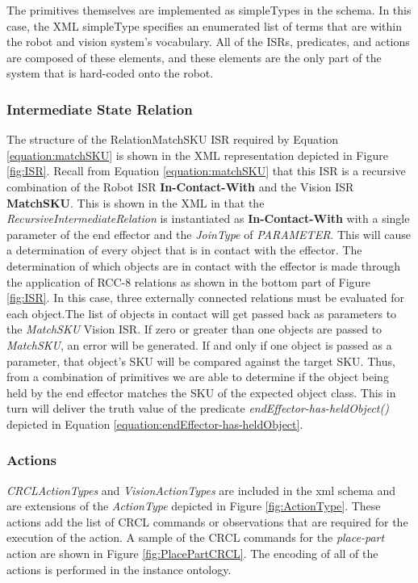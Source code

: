 The primitives themselves are implemented as simpleTypes in the schema.
In this case, the XML simpleType specifies an enumerated list of terms
that are within the robot and vision system's vocabulary. All of the
ISRs, predicates, and actions are composed of these elements, and these
elements are the only part of the system that is hard-coded onto the
robot.
\subsubsection{Intermediate State Relation}
The structure of the RelationMatchSKU ISR required by Equation \ref{equation:matchSKU} is shown in the XML
representation
depicted in Figure \ref{fig:ISR}. 
Recall from Equation \ref{equation:matchSKU} that this ISR is 
a recursive combination of the Robot ISR \textbf{In-Contact-With} and
the Vision ISR \textbf{MatchSKU}. This is shown in the XML in that
the \textit{RecursiveIntermediateRelation} is instantiated as
\textbf{In-Contact-With} with a single parameter of the end effector
and the \textit{JoinType} of \textit{PARAMETER}. This will cause a determination
of every object that is in contact with the effector. The 
determination of which objects are in contact with the effector
is made through the application of RCC-8 relations as shown in
the bottom part of Figure \ref{fig:ISR}. In this case, three
externally connected relations must be evaluated for each
object.The list of objects in contact
will get passed back as parameters to the \textit{MatchSKU} Vision ISR.
If zero or greater than one objects are passed to \textit{MatchSKU},
an error will be generated. If and only if one object is passed as
a parameter, that object's SKU will be compared against the target
SKU. Thus, from a combination of primitives we are able to determine
if the object being held by the end effector matches the SKU of the
expected object class. This in turn will deliver the truth value
of the predicate \textit{endEffector-has-heldObject()} depicted
in Equation \ref{equation:endEffector-has-heldObject}.  
\subsubsection{Actions}
\textit{CRCLActionTypes} and \textit{VisionActionTypes} are included
in the xml schema and are extensions of the \textit{ActionType} depicted
in Figure \ref{fig:ActionType}. These actions add the list of CRCL commands or observations that are required for the execution of the action. A sample of the CRCL commands for the \textit{place-part} action
are shown in Figure \ref{fig:PlacePartCRCL}. The encoding of all of the
actions is performed in the instance ontology.

